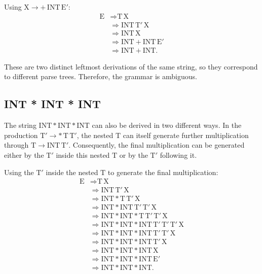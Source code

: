 \documentclass{article}
\begin{document}
Using $\text{X} \to +\,\mathrm{INT}\,\text{E}'$:
\[
\begin{aligned}
\text{E}
  &\Rightarrow \text{T}\,\text{X} \\
  &\Rightarrow \mathrm{INT}\,\text{T}'\,\text{X} \\
  &\Rightarrow \mathrm{INT}\,\text{X} \\
  &\Rightarrow \mathrm{INT} + \mathrm{INT}\,\text{E}' \\
  &\Rightarrow \mathrm{INT} + \mathrm{INT}.
\end{aligned}
\]

These are two distinct leftmost derivations of the same string, so
they correspond to different parse trees. Therefore, the grammar
is ambiguous.

\subsection{INT * INT * INT}

The string $\mathrm{INT} * \mathrm{INT} * \mathrm{INT}$ can also be
derived in two different ways. In the production
$\text{T}' \to *\,\text{T}\,\text{T}'$, the nested $\text{T}$ can itself
generate further multiplication through
$\text{T} \to \mathrm{INT}\,\text{T}'$.
Consequently, the final multiplication can be generated either by
the $\text{T}'$ inside this nested $\text{T}$ or by the $\text{T}'$
following it.

Using the $\text{T}'$ inside the nested $\text{T}$ to generate the
final multiplication:
\[
\begin{aligned}
\text{E}
  &\Rightarrow \text{T}\,\text{X} \\
  &\Rightarrow \mathrm{INT}\,\text{T}'\,\text{X} \\
  &\Rightarrow \mathrm{INT} * \text{T}\,\text{T}'\,\text{X} \\
  &\Rightarrow \mathrm{INT} * \mathrm{INT}\,\text{T}'\,\text{T}'\,\text{X} \\
  &\Rightarrow \mathrm{INT} * \mathrm{INT} * \text{T}\,\text{T}'\,\text{T}'\,\text{X} \\
  &\Rightarrow \mathrm{INT} * \mathrm{INT} * \mathrm{INT}\,\text{T}'\,\text{T}'\,\text{T}'\,\text{X} \\
  &\Rightarrow \mathrm{INT} * \mathrm{INT} * \mathrm{INT}\,\text{T}'\,\text{T}'\,\text{X} \\
  &\Rightarrow \mathrm{INT} * \mathrm{INT} * \mathrm{INT}\,\text{T}'\,\text{X} \\
  &\Rightarrow \mathrm{INT} * \mathrm{INT} * \mathrm{INT}\,\text{X} \\
  &\Rightarrow \mathrm{INT} * \mathrm{INT} * \mathrm{INT}\,\text{E}' \\
  &\Rightarrow \mathrm{INT} * \mathrm{INT} * \mathrm{INT}.
\end{aligned}
\]
\end{document}
